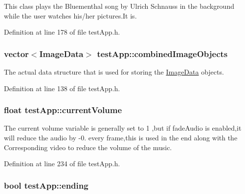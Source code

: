 This class plays the Bluementhal song by Ulrich Schnauss in the background while the user watches his/her pictures.\-It is. 



Definition at line 178 of file test\-App.\-h.

\hypertarget{classtest_app_aced9b8a8419c8465877c2c9cd43f8934}{
\subsubsection[{combined\-Image\-Objects}]{\setlength{\rightskip}{0pt plus 5cm}vector$<${\bf Image\-Data}$>$ test\-App\-::combined\-Image\-Objects}}\label{classtest_app_aced9b8a8419c8465877c2c9cd43f8934}


The actual data structure that is used for storing the \hyperlink{struct_image_data}{Image\-Data} objects. 



Definition at line 138 of file test\-App.\-h.

\hypertarget{classtest_app_a51c20c5432d9f6b06f719526d9a34ee6}{
\subsubsection[{current\-Volume}]{\setlength{\rightskip}{0pt plus 5cm}float test\-App\-::current\-Volume}}\label{classtest_app_a51c20c5432d9f6b06f719526d9a34ee6}


The current volume variable is generally set to 1 ,but if fade\-Audio is enabled,it will reduce the audio by -\/0. every frame,this is used in the end along with the Corresponding video to reduce the volume of the music. 



Definition at line 234 of file test\-App.\-h.

\hypertarget{classtest_app_acf09303bc452d2a38098f6bf94655408}{
\subsubsection[{ending}]{\setlength{\rightskip}{0pt plus 5cm}bool test\-App\-::ending}}\label{classtest_app_acf09303bc452d2a38098f6bf94655408}


